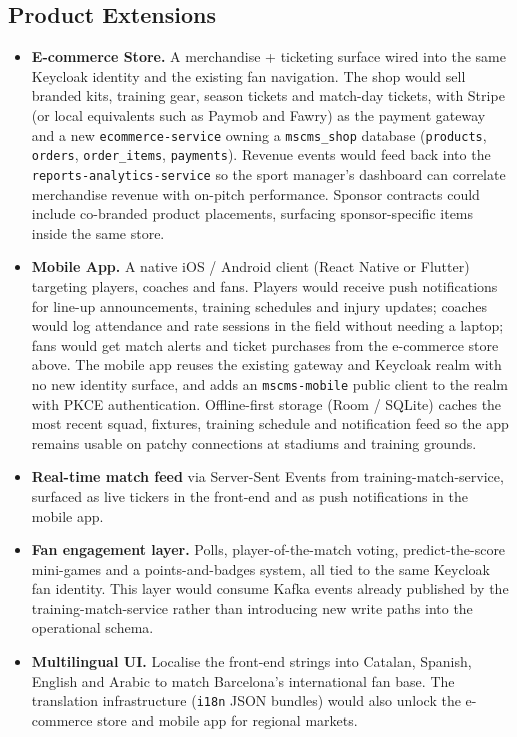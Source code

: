 \documentclass[12pt,a4paper,oneside]{report}
\begin{document}
\subsection*{Product Extensions}
\begin{itemize}[leftmargin=*]
  \item \textbf{E-commerce Store.} A merchandise + ticketing surface
        wired into the same Keycloak identity and the existing fan
        navigation. The shop would sell branded kits, training
        gear, season tickets and match-day tickets, with Stripe (or
        local equivalents such as Paymob and Fawry) as the payment
        gateway and a new \texttt{ecommerce-service} owning a
        \texttt{mscms\_shop} database (\texttt{products},
        \texttt{orders}, \texttt{order\_items}, \texttt{payments}).
        Revenue events would feed back into the
        \texttt{reports-analytics-service} so the sport manager's
        dashboard can correlate merchandise revenue with on-pitch
        performance. Sponsor contracts could include co-branded
        product placements, surfacing sponsor-specific items inside
        the same store.
  \item \textbf{Mobile App.} A native iOS / Android client (React
        Native or Flutter) targeting players, coaches and fans.
        Players would receive push notifications for line-up
        announcements, training schedules and injury updates;
        coaches would log attendance and rate sessions in the field
        without needing a laptop; fans would get match alerts and
        ticket purchases from the e-commerce store above. The mobile
        app reuses the existing gateway and Keycloak realm with no
        new identity surface, and adds an \texttt{mscms-mobile}
        public client to the realm with PKCE authentication.
        Offline-first storage (Room / SQLite) caches the most recent
        squad, fixtures, training schedule and notification feed so
        the app remains usable on patchy connections at stadiums
        and training grounds.
  \item \textbf{Real-time match feed} via Server-Sent Events from
        training-match-service, surfaced as live tickers in the
        front-end and as push notifications in the mobile app.
  \item \textbf{Fan engagement layer.} Polls, player-of-the-match
        voting, predict-the-score mini-games and a points-and-badges
        system, all tied to the same Keycloak fan identity. This
        layer would consume Kafka events already published by the
        training-match-service rather than introducing new write
        paths into the operational schema.
  \item \textbf{Multilingual UI.} Localise the front-end strings into
        Catalan, Spanish, English and Arabic to match Barcelona's
        international fan base. The translation infrastructure
        (\texttt{i18n} JSON bundles) would also unlock the e-commerce
        store and mobile app for regional markets.
\end{itemize}
\end{document}
